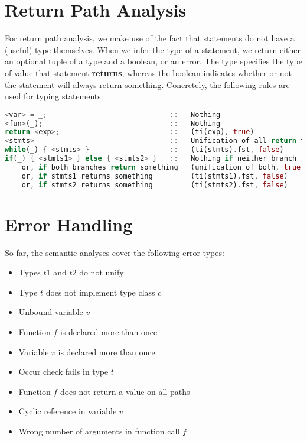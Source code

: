 \section{Return Path Analysis}
For return path analysis, we make use of the fact that statements do not have a (useful) type themselves. When we infer the type of a statement, we return either an optional tuple of a type and a boolean, or an error. The type specifies the type of value that statement \textbf{returns}, whereas the boolean indicates whether or not the statement will always return something. Concretely, the following rules are used for typing statements:
\begin{lstlisting}[language=rust]
<var> = _;                             ::   Nothing
<fun>(_);                              ::   Nothing
return <exp>;                          ::   (ti(exp), true)
<stmts>                                ::   Unification of all return types
while(_) { <stmts> }                   ::   (ti(stmts).fst, false)
if(_) { <stmts1> } else { <stmts2> }   ::   Nothing if neither branch returns
    or, if both branches return something   (unification of both, true)
    or, if stmts1 returns something         (ti(stmts1).fst, false)
    or, if stmts2 returns something         (ti(stmts2).fst, false)
\end{lstlisting}

\section{Error Handling}
So far, the semantic analyses cover the following error types:

\begin{itemize}
    \item Types $t1$ and $t2$ do not unify
    \item Type $t$ does not implement type class $c$
    \item Unbound variable $v$
    \item Function $f$ is declared more than once
    \item Variable $v$ is declared more than once
    \item Occur check fails in type $t$
    \item Function $f$ does not return a value on all paths
    \item Cyclic reference in variable $v$
    \item Wrong number of arguments in function call $f$
\end{itemize}

